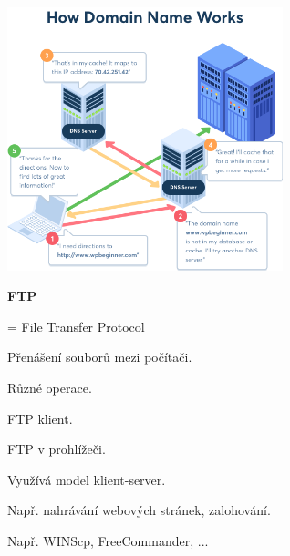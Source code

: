 \documentclass[aspectratio=169]{beamer}
\begin{document}
\begin{frame}
    \begin{center}
    \includegraphics[width=0.6\textwidth]{img/dns.png}
    \end{center}
\end{frame}

\begin{frame}
    \begin{cardTiny}
        \textbf{FTP}
        
        \begin{flushleft}
            = File Transfer Protocol

            \vspace{2ex}
            Přenášení souborů mezi počítači.

            Různé operace.

            \vspace{2ex}
            FTP klient.

            FTP v prohlížeči.

            \vspace{2ex}
            Využívá model klient-server.

            Např. nahrávání webových stránek, zalohování.

            Např. WINScp, FreeCommander, ...
        \end{flushleft}
    \end{cardTiny}
\end{frame}
\end{document}

